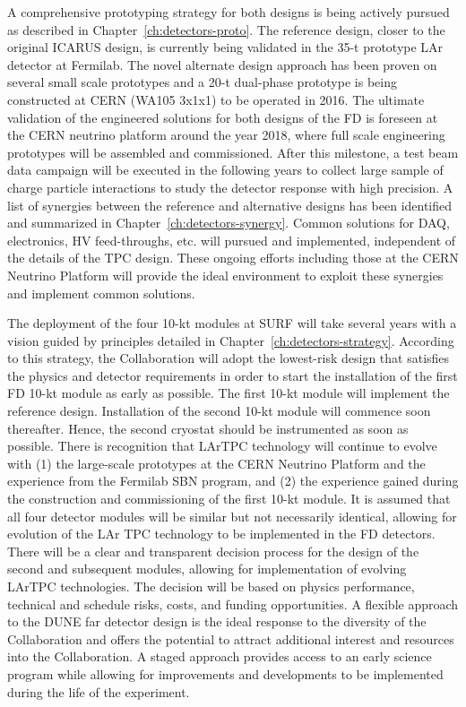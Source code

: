 A comprehensive prototyping strategy for both designs is being actively
pursued as described in Chapter~\ref{ch:detectors-proto}.  The
reference design, closer to the original ICARUS design, is currently
being validated in the 35-t prototype LAr detector at Fermilab.  The
novel alternate design approach has been proven on
several small scale prototypes and a 20-t dual-phase
prototype is being constructed at CERN (WA105 3x1x1) to be
operated in 2016.  The ultimate validation of the engineered solutions
for both designs of the FD is foreseen at the CERN neutrino platform
around the year 2018, where full scale engineering prototypes will be
assembled and commissioned. After this milestone, a test beam data
campaign will be executed in the following years to collect large
sample of charge particle interactions to study the detector response
with high precision. A list of synergies
between the reference and alternative designs has been identified and
summarized in Chapter~\ref{ch:detectors-synergy}. Common solutions for
DAQ, electronics, HV feed-throughs, etc. will pursued and
implemented, independent of the details of the TPC design. These ongoing
efforts including those at the CERN Neutrino Platform will provide the ideal
environment to exploit these synergies and implement common solutions.

The deployment of the four 10-kt modules at SURF will take several
years with a vision guided by principles detailed in
Chapter~\ref{ch:detectors-strategy}. According to this strategy, the
Collaboration will adopt the lowest-risk design that satisfies the
physics and detector requirements in order to start the
installation of the first FD 10-kt module as early as possible.
The first 10-kt module will implement the reference design. %
Installation of the second 10-kt module will commence
soon thereafter.  Hence, the second cryostat should be
instrumented as soon as possible.  There is recognition that
LArTPC technology will continue to evolve with (1) the large-scale
prototypes at the CERN Neutrino Platform and the experience from the
Fermilab SBN program, and (2) the experience gained during the
construction and commissioning of the first 10-kt module.  It is
assumed that all four detector modules will be similar but not
necessarily identical, allowing for evolution of the LAr TPC
technology to be implemented in the FD detectors. There will be a
clear and transparent decision process for the design of the second
and subsequent modules, allowing for implementation of evolving LArTPC
technologies. The decision will be based on physics performance,
technical and schedule risks, costs, and funding opportunities.  A
flexible approach to the DUNE far detector design is the ideal
response to the diversity of the Collaboration and offers the
potential to attract additional interest and resources into the
Collaboration. A staged approach provides access to an early science
program while allowing for improvements and developments to be
implemented during the life of the experiment.

